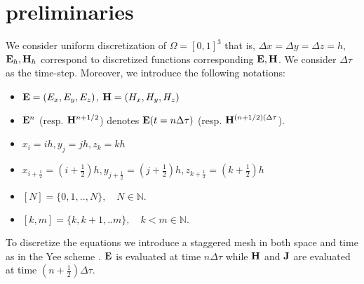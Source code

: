 \documentclass[12pt,reqno]{amsart}
\newcommand{\N}{\mathbb{N}}
\newcommand{\e}{{\bf E}}
\newcommand{\h}{{\bf H}}
\theoremstyle{definition}
\numberwithin{equation}{section}
\def\Gw{\Omega}     \def\Gx{\Xi}         \def\Gy{\Psi}
\begin{document}
	\section{preliminaries}
	We consider uniform discretization of $\Gw=[0,1]^3$ that is,
	 $\Delta x=\Delta y=\Delta z=h$,
	 $\e_h, \h_h$ correspond to discretized functions corresponding $\e,\h$.
	 We consider $\Delta \tau $ as the time-step.
	Moreover, we   introduce the following notations:
	\begin{itemize}
		\item $\e=(E_x,E_y,E_z)$, $\h=(H_x,H_y,H_z)$\\[1mm]
		\item $\e^n$  (resp. $\h^{n+1/2}$) denotes $\e(t=n\Delta \tau)$ (resp. $\h^{(n+1/2)(\Delta \tau}$).\\[1mm]
		\item $x_{i}=i h,y_{j}=j h,z_{k}=k h$ \\[1mm]
		\item $x_{i+\frac{1}{2}}=\left (i+\frac{1}{2}\right ) h, y_{j+\frac{1}{2}}=\left (j+\frac{1}{2}\right ) h, z_{k+\frac{1}{2}}=\left (k+\frac{1}{2}\right ) h$ \\[1mm]
		\item 	$[N]=\{0,1,..,N\},\quad N\in \N.$\\[1mm]
				\item 	$[k,m]=\{k,k+1,..m\},\quad k<m\in \N.$\\[1mm]
	\end{itemize}

	To discretize the equations we introduce a staggered mesh in both space and time as in the Yee scheme \cite{yee}. 
	$\e$ is  evaluated at time $n\Delta \tau$ while $\bf{H}$ and $\bf{J}$ are evaluated at time $(n\!+\! \frac{1}{2})\Delta \tau$.
\end{document}
